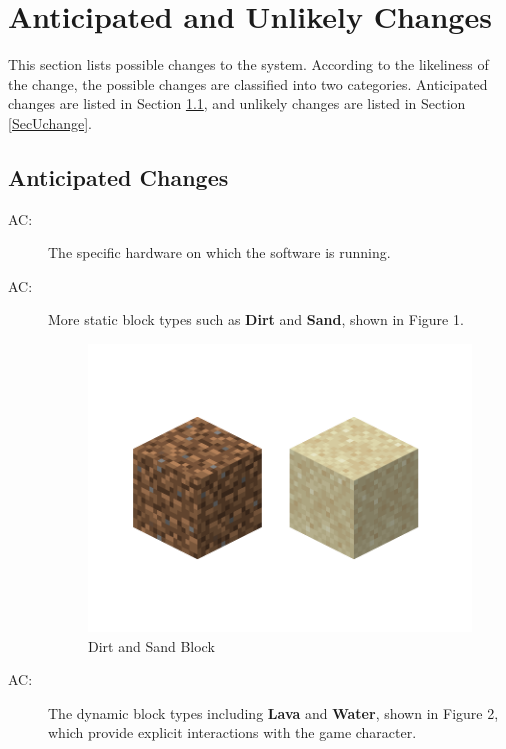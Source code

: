 \documentclass[12pt, titlepage]{article}
\newcounter{acnum}
\newcommand{\actheacnum}{AC\theacnum}
\begin{document}
\section{Anticipated and Unlikely Changes} \label{SecChange}

This section lists possible changes to the system. According to the likeliness
of the change, the possible changes are classified into two
categories. Anticipated changes are listed in Section \ref{SecAchange}, and
unlikely changes are listed in Section \ref{SecUchange}.

\subsection{Anticipated Changes} \label{SecAchange}

\begin{description}
\item[ \actheacnum \label{acHardware}:] The specific hardware on which the software is running.
\item[ \actheacnum \label{acStaBlocks}:] More static block types such as \textbf{Dirt} and \textbf{Sand}, shown in Figure 1.\\\FloatBarrier
\begin{figure}[hbt!]
\centering
\includegraphics[scale=0.25]{staticBlock}
\caption{Dirt and Sand Block}
\end{figure}
\FloatBarrier
\item[ \actheacnum \label{acDynBlocks}:] The dynamic block types including \textbf{Lava} and \textbf{Water}, shown in Figure 2, which provide explicit interactions with the game character.\\\FloatBarrier

\end{description}
\end{document}
